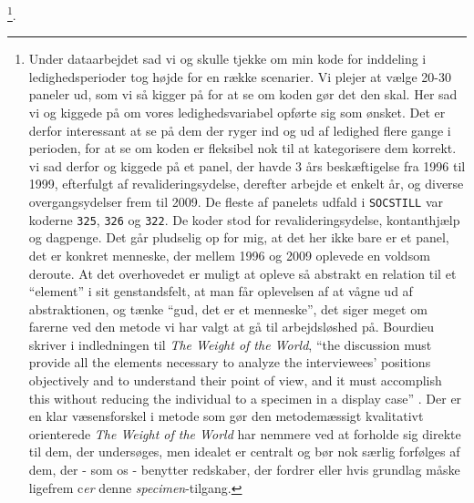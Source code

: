 \footnote{Under dataarbejdet sad vi og skulle tjekke om min kode for inddeling i ledighedsperioder tog højde for en række scenarier. Vi plejer at vælge 20-30 paneler ud, som vi så kigger på for at se om koden gør det den skal. Her sad vi og kiggede på om vores ledighedsvariabel opførte sig som ønsket. Det er derfor interessant at se på dem der ryger ind og ud af ledighed flere gange i perioden, for at se om koden er fleksibel nok til at kategorisere dem korrekt. vi sad derfor og kiggede på et panel, der havde 3 års beskæftigelse fra 1996 til 1999, efterfulgt af revalideringsydelse, derefter arbejde et enkelt år, og diverse overgangsydelser frem til 2009. De fleste af panelets udfald i \texttt{SOCSTILL} var koderne \texttt{325}, \texttt{326} og \texttt{322}. De koder stod for revalideringsydelse, kontanthjælp og dagpenge. Det går pludselig op for mig, at det her ikke bare er et panel, det er konkret menneske, der mellem 1996 og 2009 oplevede en voldsom deroute. At det overhovedet er muligt at opleve så abstrakt en relation til et “element” i sit genstandsfelt, at man får oplevelsen af at vågne ud af abstraktionen, og tænke “gud, det er et menneske”, det siger meget om farerne ved den metode vi har valgt at gå til arbejdsløshed på. Bourdieu skriver i indledningen til \emph{The Weight of the World}, “the discussion must provide all the elements necessary to analyze the interviewees' positions objectively and to understand their point of view, and it must accomplish this without reducing the individual to a specimen in a display case” \parencite[2]{Bourdieu1999}. Der er en klar væsensforskel i metode som gør den metodemæssigt kvalitativt orienterede \emph{The Weight of the World} har nemmere ved at forholde sig direkte til dem, der undersøges, men idealet er centralt og bør nok særlig forfølges af dem, der - som os - benytter redskaber, der fordrer eller hvis grundlag måske ligefrem c\emph{er} denne \emph{specimen}-tilgang.}. 
%
